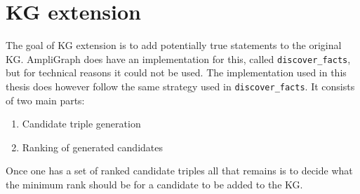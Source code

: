 

\newpage

\section{KG extension}

The goal of KG extension is to add potentially true statements to the original KG. AmpliGraph does have an implementation for this, called \texttt{discover\_facts}, but for technical reasons it could not be used. The implementation used in this thesis does however follow the same strategy used in \texttt{discover\_facts}. It consists of two main parts:
\begin{enumerate}
    \item Candidate triple generation
    \item Ranking of generated candidates
\end{enumerate}
Once one has a set of ranked candidate triples all that remains is to decide what the minimum rank should be for a candidate to be added to the KG.


